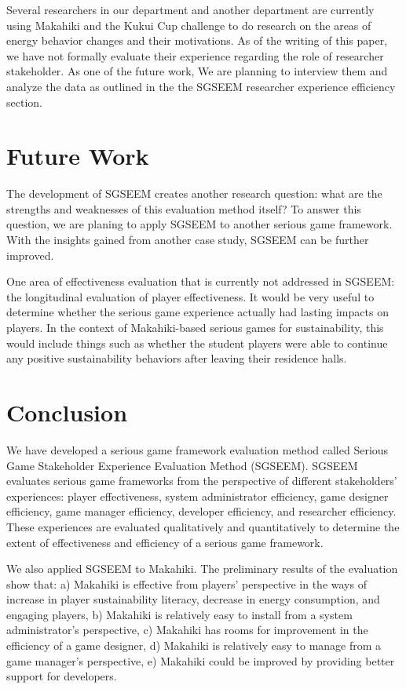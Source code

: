 \documentclass{sigchi}
\begin{document}
Several researchers in our department and another department are currently using
 Makahiki and the Kukui Cup challenge to do research on the areas of energy behavior
 changes and their motivations. As of the writing of this paper, we have not formally evaluate their experience regarding the role of researcher stakeholder. As one of
  the future work, We are planning to interview them and analyze the data as outlined
  in the the SGSEEM researcher experience efficiency section.

\section{Future Work}

The development of SGSEEM creates another research question:
what are the strengths and weaknesses of this evaluation method itself? To
answer this question, we are planing to apply SGSEEM
to another serious game framework.
With the insights gained from another case study, SGSEEM can be further
improved.

One area of effectiveness evaluation that is currently not addressed in
SGSEEM: the longitudinal evaluation of player effectiveness. It would be
very useful to determine whether the serious game experience actually
had lasting impacts on players. In the context of Makahiki-based serious
games for sustainability, this would include things such as whether the
student players were able to continue any positive sustainability
behaviors after leaving their residence halls.

\section{Conclusion}

We have developed a serious game framework evaluation method called
Serious Game Stakeholder Experience Evaluation Method (SGSEEM). SGSEEM
evaluates serious game frameworks from the perspective of different
stakeholders' experiences: player effectiveness, system administrator efficiency,
game designer efficiency, game manager efficiency,
developer efficiency, and researcher efficiency. These experiences are
evaluated qualitatively and quantitatively to determine the extent of effectiveness
 and efficiency of a serious game framework.

We also applied SGSEEM to Makahiki. The preliminary results of the evaluation show
that: a) Makahiki is effective from players' perspective in the ways of increase
 in player sustainability literacy, decrease in energy consumption, and engaging
 players, b) Makahiki is relatively easy to install from a system administrator's
 perspective, c) Makahiki has rooms for improvement in the efficiency of a game
 designer, d) Makahiki is relatively easy to manage from a game manager's perspective,
  e) Makahiki could be improved by providing better support for developers.
\end{document}
